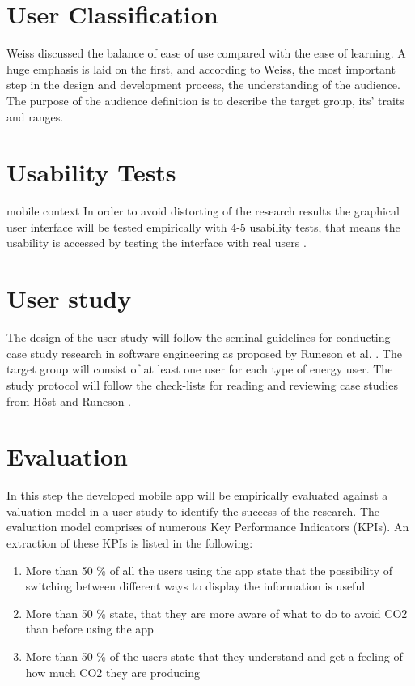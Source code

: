 \section{User Classification}


Weiss \cite{weiss2003handheld} discussed the balance of ease of use compared with the ease of learning. A huge emphasis is laid on the first, and according to Weiss, the most important step in the design and development process, the understanding of the audience. The purpose of the audience definition is to describe the target group, its' traits and ranges.





\section{Usability Tests} mobile context
In order to avoid distorting of the research results the graphical user interface will be tested empirically with 4-5 usability tests, that means the usability is accessed by testing the interface with real users \cite{nielsen1994usability}.

\section{User study}
The design of the user study will follow the seminal guidelines for conducting case study research in software engineering as proposed by Runeson et al. \cite{runeson2012case}. The target group will consist of at least one user for each type of energy user. The study protocol will follow the check-lists for reading and reviewing case studies from H\"ost and Runeson \cite{host2007checklists}.

\section{Evaluation}
In this step the developed mobile app will be empirically evaluated against a valuation model in a user study to identify the success of the research. The evaluation model comprises of numerous Key Performance Indicators (KPIs). An extraction of these KPIs is listed in the following:
\begin{enumerate}
	\item More than 50 \% of all the users using the app state that the possibility of switching between different ways to display the information is useful
	\item More than 50 \% state, that they are more aware of what to do to avoid CO2 than before using the app
	\item More than 50 \% of the users state that they understand and get a feeling of how much CO2 they are producing
\end{enumerate}



